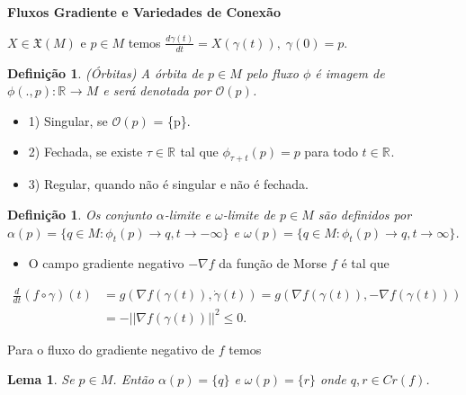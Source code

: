 \documentclass{beamer}
\newcommand{\titulo}[1]{\centering \textbf{#1}}
\newtheorem{lema}[teorema]{Lema}
\newtheorem{definicao}[teorema]{Definição}
\newcommand{\campossuaves}[1]{\mathfrak{X}(#1)}
\newcommand{\derivada}[2]{\frac{d #1}{d #2}}
\newcommand{\gradiente}{\nabla f}
\newcommand{\norma}[1]{||#1||}
\newcommand{\orbitaponto}[1]{\mathcal{O}(#1)}
\newcommand{\pontoscriticos}[1]{\textit{Cr}(#1)}
\newcommand{\real}[1]{\mathbb{R}^{#1}}
\newcommand{\reta}{\real{}}
\begin{document}
\begin{frame}
	\titulo{Fluxos Gradiente e Variedades de Conexão}
	
	$X \in \campossuaves{M}$ e $p \in M$
	temos $\derivada{\gamma(t)}{t} = X(\gamma(t)), \; \gamma(0) = p$.
	
	\begin{definicao}
		(Órbitas) A órbita de $p \in M$ pelo fluxo $\phi$ é imagem de $\phi(.,p):\reta\to M$ e será denotada por $\orbitaponto{p}$.
	\end{definicao}
	\begin{itemize}
			\item 1) Singular, se $\orbitaponto{p}$ = \{p\}.
			
			\item 2) Fechada, se existe $\tau \in \reta$ tal que $\phi_{\tau+t}(p) = p$ para todo $t \in \reta$.
			
			\item 3) Regular, quando não é singular e não é fechada.
	\end{itemize}
	
\end{frame}

\begin{frame}
	\begin{definicao}
		Os conjunto $\alpha$-limite e $\omega$-limite de $p \in M$ são definidos por $\alpha(p) = \{q \in M: \phi_{t}(p) \to q, t \to -\infty\}$ e $\omega(p) = \{q \in M: \phi_{t}(p) \to q, t \to \infty\}$.
	\end{definicao}
	\begin{itemize}
		\item O campo gradiente negativo $-\gradiente$ da função de Morse $f$ é tal que 
	\end{itemize}
	$$
	\begin{aligned}
	\derivada{}{t}(f \circ \gamma)(t) &= g(\gradiente(\gamma(t)), \dot{\gamma}(t)) 
	=g(\gradiente(\gamma(t)), -\gradiente(\gamma(t))) 
	\\
	&= -\norma{\gradiente(\gamma(t))}^{2}
	\leq 0.
	\end{aligned}
	$$
	
	Para o fluxo do gradiente negativo de $f$ temos
	
	\begin{lema}\label{lema_conjunto_limite_funcao_morse}
		Se 
		$p \in M$. Então $\alpha(p)  = \{q\}$ e $\omega(p) = \{r\}$ onde $q, r \in \pontoscriticos{f}$.
	\end{lema}
	
\end{frame}
\end{document}
